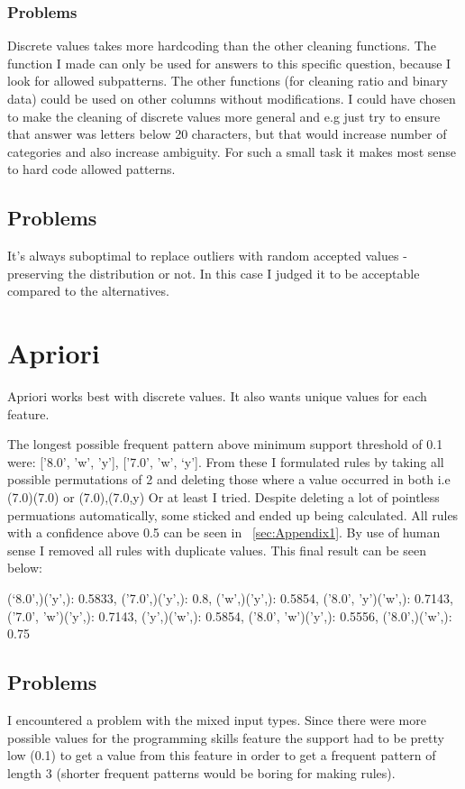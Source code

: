 \documentclass{article}
\begin{document}
\subsubsection{Problems}
Discrete values takes more hardcoding than the other cleaning functions. The function I made can only be used for answers to this specific question, because I look for allowed subpatterns. The other functions (for cleaning ratio and binary data) could be used on other columns without modifications. I could have chosen to make the cleaning of discrete values more general and e.g just try to ensure that answer was letters below 20 characters, but that would increase number of categories and also increase ambiguity. For such a small task it makes most sense to hard code allowed patterns. 

\subsection{Problems}
It's always suboptimal to replace outliers with random accepted values - preserving the distribution or not. In this case I judged it to be acceptable compared to the alternatives. 

\section{Apriori}
Apriori works best with discrete values. It also wants unique values for each feature. 

The longest possible frequent pattern above minimum support threshold of 0.1 were: ['8.0', 'w', 'y'], ['7.0', 'w', ‘y’]. 
From these I formulated rules by taking all possible permutations of 2 and deleting those where a value occurred in both i.e (7.0)(7.0) or (7.0),(7.0,y) Or at least I tried. Despite deleting a lot of pointless permuations automatically, some sticked and ended up being calculated. All rules with a confidence above 0.5 can be seen in ~\ref{sec:Appendix1}. By use of human sense I removed all rules with duplicate values. This final result can be seen below:

(‘8.0',)('y',): 0.5833, 
('7.0',)('y',): 0.8,
('w',)('y',): 0.5854,
('8.0', 'y')('w',): 0.7143,
('7.0', 'w')('y',): 0.7143,
('y',)('w',): 0.5854,
('8.0', 'w')('y',): 0.5556,
('8.0',)('w',): 0.75

\subsection{Problems}
I encountered a problem with the mixed input types. Since there were more possible values for the programming skills feature the support had to be pretty low (0.1) to get a value from this feature in order to get a frequent pattern of length 3 (shorter frequent patterns would be boring for making rules). 
\end{document}
